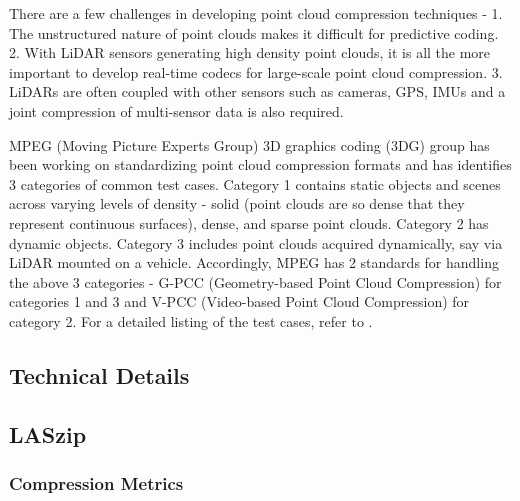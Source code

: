 There are a few challenges in developing point cloud compression techniques - 1. The unstructured nature of point clouds makes it difficult for predictive coding. 2. With LiDAR sensors generating high density point clouds, it is all the more important to develop real-time codecs for large-scale point cloud compression. 3. LiDARs are often coupled with other sensors such as cameras, GPS, IMUs and a joint compression of multi-sensor data is also required.


MPEG (Moving Picture Experts Group) 3D graphics coding (3DG) group has been working on standardizing point cloud compression formats and has identifies 3 categories of common test cases. Category 1 contains static objects and scenes across varying levels of density - solid (point clouds are so dense that they represent continuous surfaces), dense, and sparse point clouds. Category 2 has dynamic objects. Category 3 includes point clouds acquired dynamically, say via LiDAR mounted on a vehicle. Accordingly, MPEG has 2 standards for handling the above 3 categories - G-PCC (Geometry-based Point Cloud Compression) for categories 1 and 3 and V-PCC (Video-based Point Cloud Compression) for category 2. For a detailed listing of the test cases, refer to \cite{mpegx2013MPEG}.

\subsection{Technical Details}

\subsection{LASzip}

\subsubsection{Compression Metrics}

